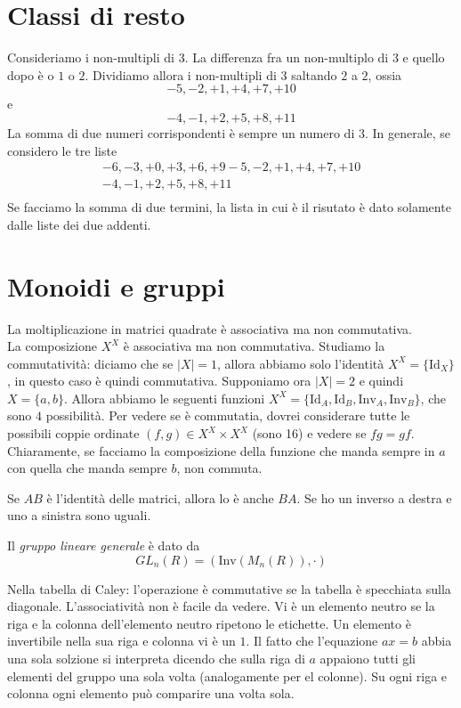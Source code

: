\documentclass[a4paper]{article}
\begin{document}
\section{Classi di resto}

Consideriamo i non-multipli di \(3\). La differenza fra un non-multiplo di 3 e quello dopo è 
o \(1\) o \(2\). Dividiamo allora i non-multipli di 3 saltando \(2\) a \(2\), ossia
\[
    -5, -2, +1, +4, +7, +10
\]
e
\[
    -4, -1, +2, +5, +8, +11
\]
La somma di due numeri corrispondenti è sempre un numero di 3.
In generale, se considero le tre liste
\begin{align*}
    -6, -3, +0, +3, +6, +9
    -5, -2, +1, +4, +7, +10 \\
    -4, -1, +2, +5, +8, +11 \\
\end{align*}
Se facciamo la somma di due termini, la lista in cui è il risutato è dato solamente dalle liste
dei due addenti.

\section{Monoidi e gruppi} %

La moltiplicazione in matrici quadrate è associativa ma non commutativa.
\\
La composizione \(X^X\) è associativa ma non commutativa.
Studiamo la commutatività:
diciamo che se \(|X| = 1\), allora abbiamo solo l'identità \(X^X = \{\text{Id}_X\}\),
in questo caso è quindi commutativa.
Supponiamo ora \(|X| = 2\) e quindi \(X = \{a,b\}\). Allora abbiamo le seguenti funzioni \(X^X = \{\text{Id}_A, \text{Id}_B, \text{Inv}_A, \text{Inv}_B\}\),
che sono \(4\) possibilità.
Per vedere se è commutatia, dovrei considerare
tutte le possibili coppie ordinate \((f,g) \in X^X \times X^X\)
(sono 16) e vedere se \(fg = gf\). Chiaramente, se facciamo la composizione della funzione che manda
sempre in \(a\) con quella che manda sempre \(b\), non commuta.

Se \(AB\) è l'identità delle matrici, allora lo è anche \(BA\).
Se ho un inverso a destra e uno a sinistra sono uguali.

Il \textit{gruppo lineare generale} è dato da
\[
    GL_n(R) = (\text{Inv}(M_n(R)), \cdot)
\]

Nella tabella di Caley: l'operazione è commutative se la tabella
è specchiata sulla diagonale. L'associatività non è facile da vedere.
Vi è un elemento neutro se la riga e la colonna dell'elemento neutro ripetono le etichette.
Un elemento è invertibile nella sua riga e colonna vi è un \(1\).
Il fatto che l'equazione \(ax = b\)
abbia una sola solzione si interpreta dicendo che sulla riga
di \(a\) appaiono tutti gli elementi del gruppo una sola volta
(analogamente per el colonne).
Su ogni riga e colonna ogni elemento può comparire una volta sola.
\end{document}
